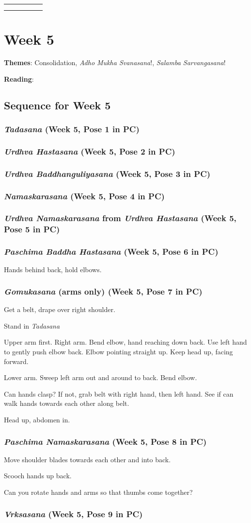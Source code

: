\documentclass{book}
\newcommand{\apose}[1]{\emph{#1}}
\newcommand{\ams}{\apose{Adho Mukha Svanasana}}
\newcommand{\gomu}{\apose{Gomukasana}}
\newcommand{\nam}{\apose{Namaskarasana}}
\newcommand{\paschbadhast}{\apose{Paschima Baddha Hastasana}}
\newcommand{\paschnama}{\apose{Paschima Namaskarasana}}
\newcommand{\sarv}{\apose{Salamba Sarvangasana}}
\newcommand{\tad}{\apose{Tadasana}}
\newcommand{\urdbad}{\apose{Urdhva Baddhanguliyasana}}
\newcommand{\urdhast}{\apose{Urdhva Hastasana}}
\newcommand{\urdnam}{\apose{Urdhva Namaskarasana}}
\newcommand{\vrk}{\apose{Vrksasana}}
\newcommand{\poseFig}[1]{
  \begin{minipage}{1.0in}
    \texttt{[image: Figures/\{"\#1"]}.jpg}
    \captionof{figure}{{#1}}
    \label{fig:\theweek.#1}
    \vspace{1ex}
  \end{minipage}
}
\newcommand{\ardhalFig}{\poseFig{Ardha Halasana}}
\newcommand{\ekapadsarvFig}{\poseFig{Eka Pada Sarvangasana}}
\newcommand{\parsvoFig}{\poseFig{Parsvottanasana}}
\newcommand{\paschiFig}{\poseFig{Paschimottanasana}}
\newcommand{\savFig}{\poseFig{Savasana}}
\newcommand{\setubandsarvFig}{\poseFig{Setu Bandha Sarvangasana}}
\newcommand{\tadFig}{\poseFig{Tadasana}}
\newcommand{\urdbadFig}{\poseFig{Urdhva Baddhanguliyasana}}
\newcommand{\utkaFig}{\poseFig{Utkatasana}}
\newcommand{\uttFig}{\poseFig{Uttanasana}}
\newcommand{\uttparsvaFig}{\poseFig{Utthita Parsvakonasana}}
\newcommand{\utttrikFig}{\poseFig{Utthita Trikonasana}}
\newcommand{\vimFig}{\poseFig{Vimanasana}}
\newcommand{\viraiFig}{\poseFig{Virabhdrasana I}}
\newcommand{\viraiiFig}{\poseFig{Virabhadrasana II}}
\newcommand{\PC}[2]{{\normalfont\normalsize \hfill(Week #1, Pose #2 in PC)}}
\newcommand{\newpose}[1]{{{#1}}}
\newcounter{week}
\newcounter{pose}
\newcommand{\week}[1]
{ \IfDecimal{#1}{\setcounter{week}{\integerpart}}{fooey}
  \setcounter{pose}{1}
  \chapter{Week {#1}}}
\newcommand{\pose}{\subsection}
\begin{document}
\begin{tabular}{|c|c|c|c|c|}
\tadFig{} & 
\urdbadFig{} & 
\utttrikFig{} & 
\viraiiFig{} & 
\uttparsvaFig{} \\ \hline
\vimFig{} & 
\viraiFig{} & 
\utkaFig{} & 
\parsvoFig{} & 
\uttFig{} \\ \hline
\ardhalFig{} & 
\ekapadsarvFig{} & 
\paschiFig{} & 
\setubandsarvFig{} & 
\savFig{}
\end{tabular}


\week{5}
\label{week:5}

\textbf{Themes}: Consolidation, \ams{}!, \sarv{}!

\textbf{Reading}: 

\section{Sequence for Week 5}
\label{seq:5}

\pose{\tad{} \PC{5}{1}}

\pose{\urdhast{} \PC{5}{2}}

\pose{\urdbad{}  \PC{5}{3}}

\pose{\nam{}  \PC{5}{4}}

\pose{\urdnam{} from \urdhast{}  \PC{5}{5}}

\pose{\newpose{\paschbadhast{}}  \PC{5}{6}}

Hands behind back, hold elbows.

\pose{\newpose{\gomu{}} (arms only) \PC{5}{7}}

Get a belt, drape over right shoulder.

Stand in \tad{}

Upper arm first. Right arm. Bend elbow, hand reaching down
back. Use left hand to gently push elbow back. Elbow pointing
straight up. Keep head up, facing forward.

Lower arm. Sweep left arm out and around to back. Bend elbow.

Can hands clasp? If not, grab belt with right hand, then left
hand. See if can walk hands towards each other along belt.

Head up, abdomen in.

\pose{\newpose{\paschnama{}}  \PC{5}{8}}

Move shoulder blades towards each other and into back.

Scooch hands up back.

Can you rotate hands and arms so that thumbs come together?

\pose{\vrk{} \PC{5}{9}}
\end{document}
